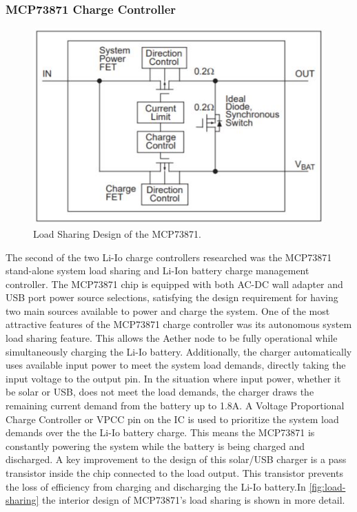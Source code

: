 \subsubsection{MCP73871 Charge Controller}
\begin{figure}
    \centering
    \includegraphics[scale=1.0]{figures/load-sharing.JPG}
    \caption{Load Sharing Design of the MCP73871.}
    \label{Sytem Load Sharing} 
\end{figure}
The second of the two Li-Io charge controllers researched was the MCP73871 stand-alone system load sharing and Li-Ion battery charge management controller. The MCP73871 chip is equipped with both AC-DC wall adapter and USB port power source selections, satisfying the design requirement for having two main sources available to power and charge the system. One of the most attractive features of the MCP73871 charge controller was its autonomous system load sharing feature. This allows the Aether node to be fully operational while simultaneously charging the Li-Io battery. Additionally, the charger automatically uses available input power to meet the system load demands, directly taking the input voltage to the output pin. In the situation where input power, whether it be solar or USB, does not meet the load demands, the charger draws the remaining current demand from the battery up to 1.8A. A Voltage Proportional Charge Controller or VPCC pin on the IC is used to prioritize the system load demands over the the Li-Io battery charge. This means the MCP73871 is constantly powering the system while the battery is being charged and discharged. A key improvement to the design of this solar/USB charger is a pass transistor inside the chip connected to the load output. This transistor prevents the loss of efficiency from charging and discharging the Li-Io battery.In \ref{fig:load-sharing} the interior design of MCP73871's load sharing is shown in more detail.    
